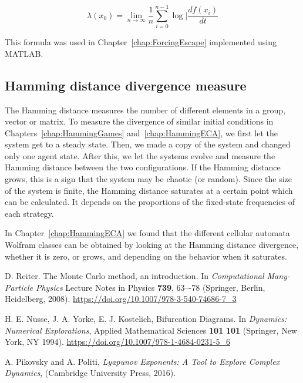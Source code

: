 \begin{equation}
\lambda(x_0) = \lim_{n \to \infty}\dfrac{1}{n}\sum_{i=0}^{n-1}\log|\dfrac{df(x_i)}{dt}
\end{equation}

This formula was used in Chapter~\ref{chap:ForcingEscape} implemented using MATLAB.

\subsection{Hamming distance divergence measure}

The Hamming distance measures the number of different elements in a group, vector or matrix. To measure the divergence of similar initial conditions in Chapters~\ref{chap:HammingGames} and~\ref{chap:HammingECA}, we first let the system get to a steady state. Then, we made a copy of the system and changed only one agent state. After this, we let the systems evolve and measure the Hamming distance between the two configurations. If the Hamming distance grows, this is a sign that the system may be chaotic (or random). Since the size of the system is finite, the Hamming distance saturates at a certain point which can be calculated. It depends on the proportions of the fixed-state frequencies of each strategy.

In Chapter~\ref{chap:HammingECA} we found that the different cellular automata Wolfram classes can be obtained by looking at the Hamming distance divergence, whether it is zero, or grows, and depending on the behavior when it saturates.



\begin{thebibliography}{02}


D. Reiter. The Monte Carlo method, an introduction. In \textit{Computational Many-Particle Physics}
Lecture Notes in  Physics \textbf{739}, 63–-78 (Springer, Berlin, Heidelberg, 2008).
\url{https://doi.org/10.1007/978-3-540-74686-7_3}


H. E. Nusse, J. A. Yorke, E. J. Kostelich, 
Bifurcation Diagrams. In \textit{Dynamics: Numerical Explorations},
Applied Mathematical Sciences \textbf{101} \textbf{101} (Springer, New York, NY 1994).
\url{https://doi.org/10.1007/978-1-4684-0231-5_6}


A. Pikovsky and A. Politi, 
\textit{Lyapunov Exponents: A Tool to Explore Complex Dynamics},
(Cambridge University Press, 2016).




\end{thebibliography}

